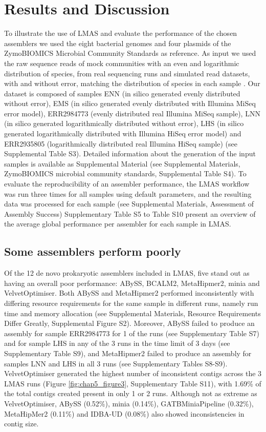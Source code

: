 \section{Results and Discussion}

To illustrate the use of LMAS and evaluate the performance of the chosen assemblers we used the eight bacterial genomes and four plasmids of the ZymoBIOMICS Microbial Community Standards as reference. As input we used the raw sequence reads of mock communities with an even and logarithmic distribution of species, from real sequencing runs \cite{nicholls_ultra-deep_2019} and simulated read datasets, with and without error, matching the distribution of species in each sample \cite{gourle_simulating_2019}. Our dataset is composed of samples ENN (in silico generated evenly distributed without error), EMS (in silico generated evenly distributed with Illumina MiSeq error model), ERR2984773 (evenly distributed real Illumina MiSeq sample), LNN (in silico generated logarithmically distributed without error), LHS (in silico generated logarithmically distributed with Illumina HiSeq error model) and ERR2935805 (logarithmically distributed real Illumina HiSeq sample) (see Supplemental Table S3). Detailed information about the generation of the input samples is available as Supplemental Material (see Supplemental Materials, ZymoBIOMICS microbial community standards, Supplemental Table S4). To evaluate the reproducibility of an assembler performance, the LMAS workflow was run three times for all samples using default parameters, and the resulting data was processed for each sample (see Supplemental Materials, Assessment of Assembly Success) Supplementary Table S5 to Table S10 present an overview of the average global performance per assembler for each sample in LMAS. 

\subsection{Some assemblers perform poorly}

Of the 12 de novo prokaryotic assemblers included in LMAS, five stand out as having an overall poor performance: ABySS, BCALM2, MetaHipmer2, minia and VelvetOptimiser. Both ABySS and MetaHipmer2 performed inconsistently with differing resource requirements for the same sample in different runs, namely run time and memory allocation (see Supplemental Materials, Resource Requirements Differ Greatly, Supplemental Figure S2).  Moreover, ABySS failed to produce an assembly for sample ERR2984773 for 1 of the runs (see Supplementary Table S7) and for sample LHS in any of the 3 runs in the time limit of 3 days (see Supplementary Table S9), and MetaHipmer2 failed to produce an assembly for samples LNN and LHS in all 3 runs (see Supplementary Tables S8-S9). VelvetOptimiser generated the highest number of inconsistent contigs across the 3 LMAS runs (Figure \ref{fig:chap5_figure3}, Supplementary Table S11), with 1.69\% of the total contigs created present in only 1 or 2 runs. Although not as extreme as VelvetOptimiser, ABySS (0.52\%), minia (0.14\%), GATBMiniaPipeline (0.32\%), MetaHipMer2 (0.11\%) and IDBA-UD (0.08\%) also showed inconsistencies in contig size.

